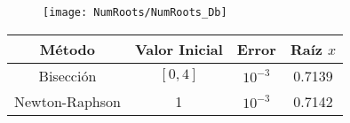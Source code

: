 \begin{figure}[H]
    \texttt{[image: NumRoots/NumRoots\_Db]}
    \centering
\end{figure}

\begin{table}[H]
	\begin{center}
		\begin{tabular}{ |c|c|c|c| }
			\hline
			Método & Valor Inicial & Error & Raíz \(x\) \\
			\hline
			\hline
			Bisección 		& \([0,4]\) &	\(10^{-3}\) 	& 0.7139 	\\
			\hline
			Newton-Raphson 	& 	1 		& 	\(10^{-3}\)  	& 0.7142	\\
			\hline
		\end{tabular}
	\end{center}
\end{table}